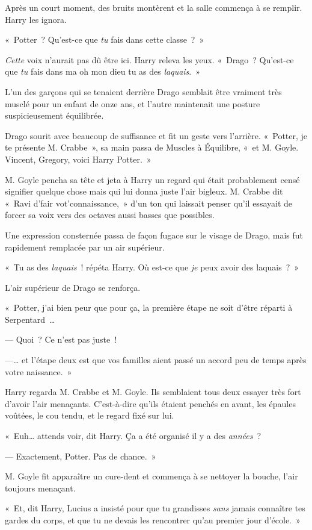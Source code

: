 Après un court moment, des bruits montèrent et la salle commença à se remplir. Harry les ignora.

«~Potter~? Qu'est-ce que \emph{tu} fais dans cette classe~?~»

\emph{Cette} voix n'aurait pas dû être ici. Harry releva les yeux. «~Drago~? Qu'est-ce que \emph{tu} fais dans ma oh mon dieu tu as des \emph{laquais}.~»

L'un des garçons qui se tenaient derrière Drago semblait être vraiment très musclé pour un enfant de onze ans, et l'autre maintenait une posture suspicieusement équilibrée.

Drago sourit avec beaucoup de suffisance et fit un geste vers l'arrière. «~Potter, je te présente M. Crabbe~», sa main passa de Muscles à Équilibre, «~et M. Goyle. Vincent, Gregory, voici Harry Potter.~»

M. Goyle pencha sa tête et jeta à Harry un regard qui était probablement censé signifier quelque chose mais qui lui donna juste l'air bigleux. M. Crabbe dit «~Ravi d'fair vot'connaissance,~» d'un ton qui laissait penser qu'il essayait de forcer sa voix vers des octaves aussi basses que possibles.

Une expression consternée passa de façon fugace sur le visage de Drago, mais fut rapidement remplacée par un air supérieur.

«~Tu as des \emph{laquais}~! répéta Harry. Où est-ce que \emph{je} peux avoir des laquais~?~»

L'air supérieur de Drago se renforça.

«~Potter, j'ai bien peur que pour ça, la première étape ne soit d'être réparti à Serpentard~…

--- Quoi~? Ce n'est pas juste~!

---… et l'étape deux est que vos familles aient passé un accord peu de temps après votre naissance.~»

Harry regarda M. Crabbe et M. Goyle. Ils semblaient tous deux essayer très fort d'avoir l'air menaçants. C'est-à-dire qu'ils étaient penchés en avant, les épaules voûtées, le cou tendu, et le regard fixé sur lui.

«~Euh… attends voir, dit Harry. Ça a été organisé il y a des \emph{années}~?

--- Exactement, Potter. Pas de chance.~»

M. Goyle fit apparaître un cure-dent et commença à se nettoyer la bouche, l'air toujours menaçant.

«~Et, dit Harry, Lucius a insisté pour que tu grandisses \emph{sans} jamais connaître tes gardes du corps, et que tu ne devais les rencontrer qu'au premier jour d'école.~»

